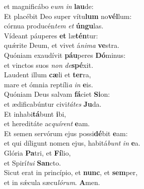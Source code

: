 \oddverse et magnificábo e\textit{um} \textit{in} \textbf{lau}de:\\
\evenverse Et placébit Deo super vítu\textbf{lum} no\textbf{vél}lum:~\*\\
\evenverse córnua producén\textit{tem} \textit{et} \textbf{ún}\textbf{gu}las.\\
\oddverse Vídeant páuperes \textbf{et} læ\textbf{tén}tur:~\*\\
\oddverse quǽrite Deum, et vivet á\textit{ni}\textit{ma} \textbf{ve}stra.\\
\evenverse Quóniam exaudívit \textbf{páu}peres \textbf{Dó}minus:~\*\\
\evenverse et vinctos suos \textit{non} \textit{de}\textbf{spé}xit.\\
\oddverse Laudent illum \textbf{cæ}li et \textbf{ter}ra,~\*\\
\oddverse mare et ómnia reptíli\textit{a} \textit{in} \textbf{e}is.\\
\evenverse Quóniam Deus salvam \textbf{fá}ciet \textbf{Si}on:~\*\\
\evenverse et ædificabúntur civi\textit{tá}\textit{tes} \textbf{Ju}da.\\
\oddverse Et inhabi\textbf{tá}bunt \textbf{i}bi,~\*\\
\oddverse et hereditáte ac\textit{quí}\textit{rent} \textbf{e}am.\\
\evenverse Et semen servórum ejus possi\textbf{dé}bit \textbf{e}am:~\*\\
\evenverse et qui díligunt nomen ejus, habitá\textit{bunt} \textit{in} \textbf{e}a.\\
\oddverse Glória \textbf{Pa}tri, et \textbf{Fí}lio,~\*\\
\oddverse et Spirí\textit{tu}\textit{i} \textbf{San}cto.\\
\evenverse Sicut erat in princípio, et \textbf{nunc}, et \textbf{sem}per,~\*\\
\evenverse et in sǽcula sæcu\textit{ló}\textit{rum}. \textbf{A}men.\\
